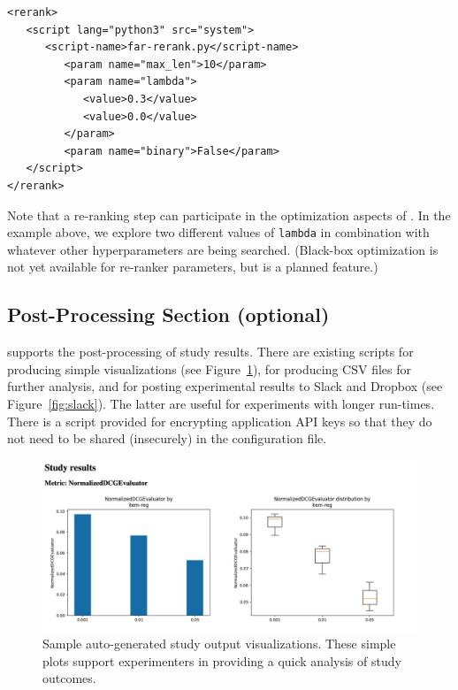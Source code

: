 {\small
\begin{verbatim}
<rerank>
   <script lang="python3" src="system">
      <script-name>far-rerank.py</script-name>
         <param name="max_len">10</param>
         <param name="lambda">
            <value>0.3</value>
            <value>0.0</value>
         </param>
         <param name="binary">False</param>
   </script>
</rerank>
\end{verbatim}}

Note that a re-ranking step can participate in the optimization aspects of \libauto{}. In the example above, we explore two different values of \texttt{lambda} in combination with whatever other hyperparameters are being searched. (Black-box optimization is not yet available for re-ranker parameters, but is a planned feature.)

\subsection{Post-Processing Section (optional)}
\libauto{} supports the post-processing of study results. There are existing scripts for producing simple visualizations (see Figure~\ref{fig:viz}), for producing CSV files for further analysis, and for posting experimental results to Slack and Dropbox (see Figure~\ref{fig:slack}). The latter are useful for experiments with longer run-times. There is a script provided for encrypting application API keys so that they do not need to be shared (insecurely) in the configuration file. 

\begin{figure}[ht!]
    \centering
    \includegraphics[width=0.8\linewidth]{figs/chapter6-librecauto/sample-output.png}
    \caption{Sample auto-generated study output visualizations. These simple plots support experimenters in providing a quick analysis of study outcomes.}
    \label{fig:viz}
    \vspace{-0.15in}
\end{figure}


